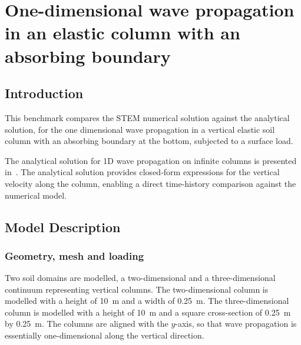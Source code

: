 \chapter{One-dimensional wave propagation in an elastic column with an absorbing boundary} \label{ch:one_dim_abs_boundary}

\section{Introduction}
This benchmark compares the STEM numerical solution against the analytical solution,
for the one dimensional wave propagation in a vertical elastic soil column with an absorbing boundary at the bottom,
subjected to a surface load.

The analytical solution for 1D wave propagation on infinite columns is presented in~\cite{Verruijt_2010}.
The analytical solution provides closed-form expressions for the vertical velocity along the column,
enabling a direct time-history comparison against the numerical model.

\section{Model Description}

\subsection{Geometry, mesh and loading}
Two soil domains are modelled, a two-dimensional and a three-dimensional continuum representing vertical columns.
The two-dimensional column is modelled with a height of \qty{10}{\meter} and a width of \qty{0.25}{\meter}.
The three-dimensional column is modelled with a height of \qty{10}{\meter} and a square cross-section of
\qty{0.25}{\meter} by \qty{0.25}{\meter}.
The columns are aligned with the $y$-axis, so that wave propagation is essentially one-dimensional along
the vertical direction.

